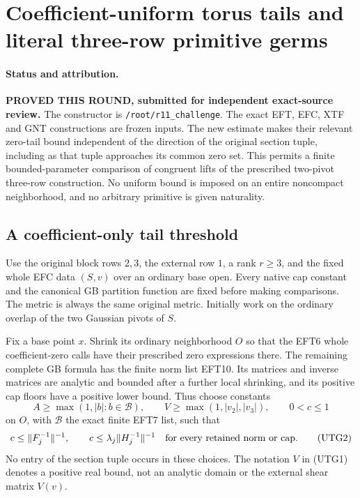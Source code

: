 \section{Coefficient-uniform torus tails and literal three-row primitive germs}
\label{sec:r12-uniform-tail-three-row-germs}

\paragraph{Status and attribution.}
\textbf{PROVED THIS ROUND, submitted for independent exact-source review.}
The constructor is \texttt{/root/r11\_challenge}.  The exact EFT,
EFC, XTF and GNT constructions are frozen inputs.  The new estimate
makes their relevant zero-tail bound independent of the direction
of the original section tuple, including as that tuple approaches
its common zero set.  This permits a finite bounded-parameter
comparison of congruent lifts of the prescribed two-pivot three-row
construction.  No uniform bound is imposed on an entire noncompact
neighborhood, and no arbitrary primitive is given naturality.

\subsection{A coefficient-only tail threshold}

Use the original block rows $2,3$, the external row $1$, a rank
$r\ge3$, and the fixed whole EFC data $(S,v)$ over an ordinary
base open.  Every native cap constant and the canonical GB
partition function are fixed before making comparisons.  The
metric is always the same original metric.  Initially work on
the ordinary overlap of the two Gaussian pivots of $S$.

Fix a base point $x$.  Shrink its ordinary neighborhood $O$ so
that the EFT6 whole coefficient-zero calls have their prescribed
zero expressions there.  The remaining complete GB formula has
the finite norm list EFT10.  Its matrices and inverse matrices
are analytic and bounded after a further local shrinking, and
its positive cap floors have a positive lower bound.  Thus choose
constants
\[
 A\ge\max(1,|b|:b\in\mathcal B),\qquad
 V\ge\max(1,|v_2|,|v_3|),\qquad 0<c\le1
 \tag{UTG1}
\]
on $O$, with $\mathcal B$ the exact finite EFT7 list, such that
\[
 c\le\|F_j^{-1}\|^{-1},\qquad
 c\le\lambda_j\|H_j^{-1}\|^{-1}
                      \quad\hbox{for every retained norm or cap.}
 \tag{UTG2}
\]
No entry of the section tuple occurs in these choices.  The
notation $V$ in (UTG1) denotes a positive real bound, not an
analytic domain or the external shear matrix $V(v)$.

